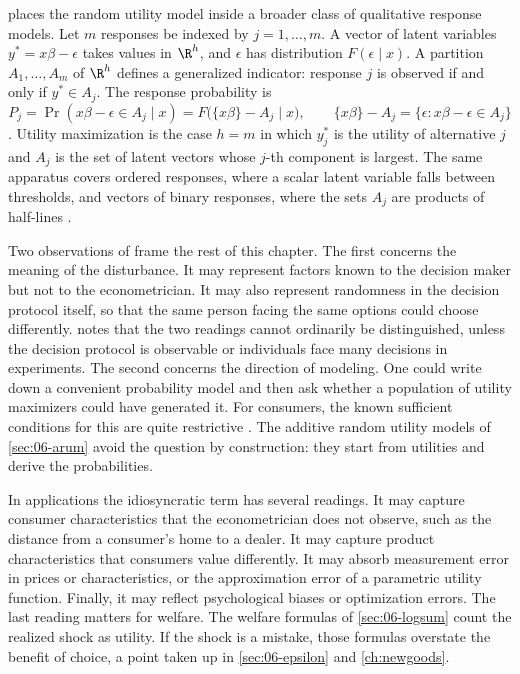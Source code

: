 \citet[sec.~3.1]{McFadden1984} places the random utility model inside a broader class of qualitative response
models. Let $m$ responses be indexed by $j = 1, \dots, m$. A vector of latent variables
$y^* = x\beta - \epsilon$ takes values in $\R^h$, and $\epsilon$ has distribution $F(\epsilon \mid x)$. A
partition $A_1, \dots, A_m$ of $\R^h$ defines a generalized indicator: response $j$ is observed if and only if
$y^* \in A_j$. The response probability is
\begin{equation}\label{eq:06-latent}
P_j = \Pr(x\beta - \epsilon \in A_j \mid x) = F\big(\{x\beta\} - A_j \mid x\big),
\qquad \{x\beta\} - A_j = \{\epsilon : x\beta - \epsilon \in A_j\}
\end{equation}
\citep[eq.~3.2, p.~1403]{McFadden1984}. Utility maximization is the case $h = m$ in which $y_j^*$ is the
utility of alternative $j$ and $A_j$ is the set of latent vectors whose $j$-th component is largest. The same
apparatus covers ordered responses, where a scalar latent variable falls between thresholds, and vectors of
binary responses, where the sets $A_j$ are products of half-lines \citep[pp.~1403--1404]{McFadden1984}.

Two observations of \citet{McFadden1984} frame the rest of this chapter. The first concerns the meaning of
the disturbance. It may represent factors known to the decision maker but not to the econometrician. It may
also represent randomness in the decision protocol itself, so that the same person facing the same options
could choose differently. \citet[p.~1412]{McFadden1984} notes that the two readings cannot ordinarily be
distinguished, unless the decision protocol is observable or individuals face many decisions in experiments.
The second concerns the direction of modeling. One could write down a convenient probability model and then
ask whether a population of utility maximizers could have generated it. For consumers, the known sufficient
conditions for this are quite restrictive \citep[p.~1406]{McFadden1984}. The additive random utility models
of \cref{sec:06-arum} avoid the question by construction: they start from utilities and derive the
probabilities.

In applications the idiosyncratic term has several readings. It may capture consumer characteristics that the
econometrician does not observe, such as the distance from a consumer's home to a dealer. It may capture
product characteristics that consumers value differently. It may absorb measurement error in prices or
characteristics, or the approximation error of a parametric utility function. Finally, it may reflect
psychological biases or optimization errors. The last reading matters for welfare. The welfare formulas of
\cref{sec:06-logsum} count the realized shock as utility. If the shock is a mistake, those formulas overstate
the benefit of choice, a point taken up in \cref{sec:06-epsilon} and \cref{ch:newgoods}.

